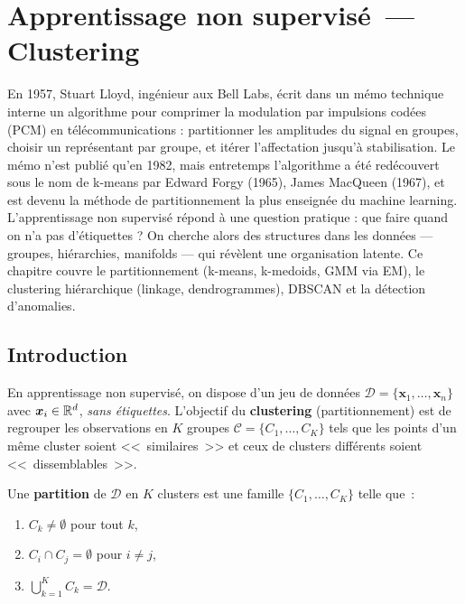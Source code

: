 \chapter{Apprentissage non supervis\'e~--- Clustering}
\label{ch:non-supervise}

En 1957, Stuart Lloyd, ingénieur aux Bell Labs, écrit dans un mémo technique interne un algorithme pour comprimer la modulation par impulsions codées (PCM) en télécommunications : partitionner les amplitudes du signal en groupes, choisir un représentant par groupe, et itérer l'affectation jusqu'à stabilisation. Le mémo n'est publié qu'en 1982, mais entretemps l'algorithme a été redécouvert sous le nom de k-means par Edward Forgy (1965), James MacQueen (1967), et est devenu la méthode de partitionnement la plus enseignée du machine learning. L'apprentissage non supervisé répond à une question pratique : que faire quand on n'a pas d'étiquettes ? On cherche alors des structures dans les données --- groupes, hiérarchies, manifolds --- qui révèlent une organisation latente. Ce chapitre couvre le partitionnement (k-means, k-medoids, GMM via EM), le clustering hiérarchique (linkage, dendrogrammes), DBSCAN et la détection d'anomalies.

\section{Introduction}

En apprentissage non supervis\'e, on dispose d'un jeu de donn\'ees
$\mathcal{D} = \{\bm{x}_1, \ldots, \bm{x}_n\}$ avec $\bm{x}_i \in \mathbb{R}^d$,
\emph{sans \'etiquettes}. L'objectif du \textbf{clustering} (partitionnement)
est de regrouper les observations en $K$ groupes
$\mathcal{C} = \{C_1, \ldots, C_K\}$ tels que les points d'un m\^eme cluster
soient <<~similaires~>> et ceux de clusters diff\'erents soient <<~dissemblables~>>.

\begin{definition}[Partition]
Une \textbf{partition} de $\mathcal{D}$ en $K$ clusters est une famille
$\{C_1, \ldots, C_K\}$ telle que~:
\begin{enumerate}
  \item $C_k \neq \emptyset$ pour tout $k$,
  \item $C_i \cap C_j = \emptyset$ pour $i \neq j$,
  \item $\bigcup_{k=1}^K C_k = \mathcal{D}$.
\end{enumerate}
\end{definition}

